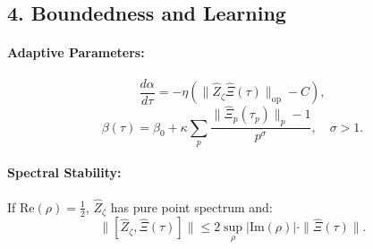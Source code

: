 \documentclass{article}
\theoremstyle{plain}
\theoremstyle{claimstyle}
\begin{document}
\subsection*{4. Boundedness and Learning}

\paragraph*{Adaptive Parameters:}

\[
\frac{d\alpha}{d\tau} = -\eta \left( \| \hat{Z}_\zeta \hat{\Xi}(\tau) \|_{\text{op}} - C \right),
\]
\[
\beta(\tau) = \beta_0 + \kappa \sum_p \frac{\| \hat{\Xi}_p(\tau_p) \|_p - 1}{p^\sigma}, \quad \sigma > 1.
\]

\paragraph*{Spectral Stability:}

If \( \text{Re}(\rho) = \frac{1}{2} \), \( \hat{Z}_\zeta \) has pure point spectrum and:
\[
\| [\hat{Z}_\zeta, \hat{\Xi}(\tau)] \| \leq 2 \sup_\rho |\text{Im}(\rho)| \cdot \| \hat{\Xi}(\tau) \|.
\]
\end{document}
